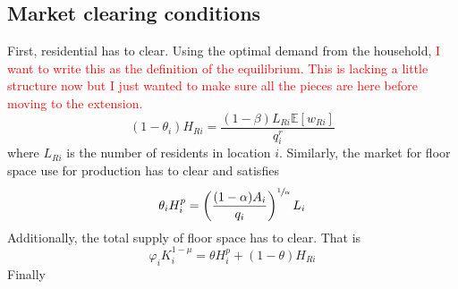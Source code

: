 \documentclass[12pt]{article}
\newcommand{\E}{\mathbb{E}}
\begin{document}
\subsection{Market clearing conditions}
First, residential has to clear. Using the optimal demand from the household, \textcolor{red}{I want to write this as the definition of the equilibrium. This is lacking a little structure now but I just wanted to make sure all the pieces are here before moving to the extension. }
\begin{equation}
    (1-\theta_i)H_{Ri} = \frac{(1-\beta)L_{Ri}\E\left[w_{Ri}\right]}{q_i^r}
\end{equation}
where $L_{Ri}$ is the number of residents in location $i$. Similarly, the market for floor space use for production has to clear and satisfies
\begin{equation}
    \theta_i H_i^p = \left(\frac{(1-\alpha)A_i}{q_i}\right)^{\sfrac{1}{\alpha}}L_i
\end{equation}
Additionally, the total supply of floor space has to clear. That is 
\begin{equation}
    \varphi_iK_i^{1-\mu} = \theta H_i^p + (1-\theta)H_{Ri}
\end{equation}
Finally
\end{document}

